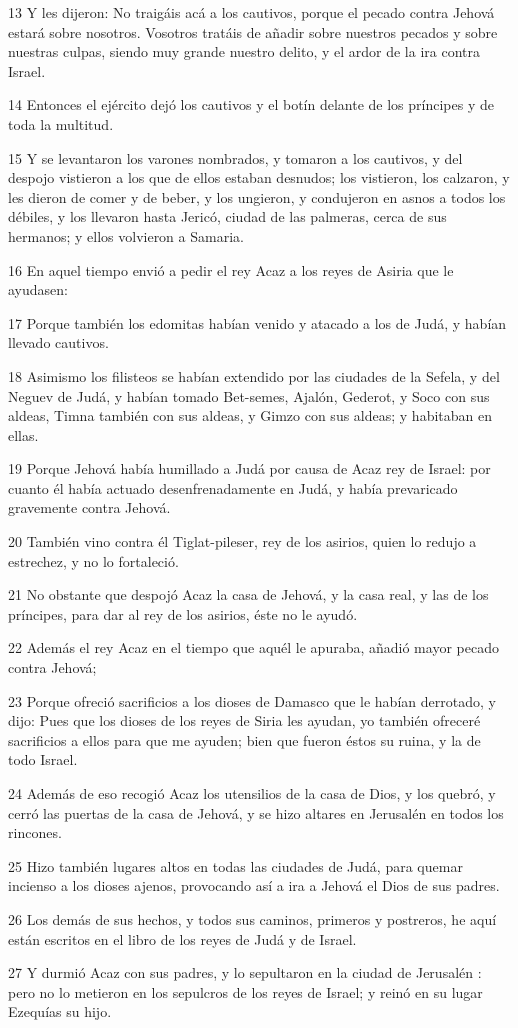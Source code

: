 \par 13 Y les dijeron: No traigáis acá a los cautivos, porque el pecado contra Jehová estará sobre nosotros. Vosotros tratáis de añadir sobre nuestros pecados y sobre nuestras culpas, siendo muy grande nuestro delito, y el ardor de la ira contra Israel.
\par 14 Entonces el ejército dejó los cautivos y el botín delante de los príncipes y de toda la multitud.
\par 15 Y se levantaron los varones nombrados, y tomaron a los cautivos, y del despojo vistieron a los que de ellos estaban desnudos; los vistieron, los calzaron, y les dieron de comer y de beber, y los ungieron, y condujeron en asnos a todos los débiles, y los llevaron hasta Jericó, ciudad de las palmeras, cerca de sus hermanos; y ellos volvieron a Samaria.
\par 16 En aquel tiempo envió a pedir el rey Acaz a los reyes de Asiria que le ayudasen:
\par 17 Porque también los edomitas habían venido y atacado a los de Judá, y habían llevado cautivos.
\par 18 Asimismo los filisteos se habían extendido por las ciudades de la Sefela, y del Neguev de Judá, y habían tomado Bet-semes, Ajalón, Gederot, y Soco con sus aldeas, Timna también con sus aldeas, y Gimzo con sus aldeas; y habitaban en ellas.
\par 19 Porque Jehová había humillado a Judá por causa de Acaz rey de Israel: por cuanto él había actuado desenfrenadamente en Judá, y había prevaricado gravemente contra Jehová.
\par 20 También vino contra él Tiglat-pileser, rey de los asirios, quien lo redujo a estrechez, y no lo fortaleció.
\par 21 No obstante que despojó Acaz la casa de Jehová, y la casa real, y las de los príncipes, para dar al rey de los asirios, éste no le ayudó.
\par 22 Además el rey Acaz en el tiempo que aquél le apuraba, añadió mayor pecado contra Jehová;
\par 23 Porque ofreció sacrificios a los dioses de Damasco que le habían derrotado, y dijo: Pues que los dioses de los reyes de Siria les ayudan, yo también ofreceré sacrificios a ellos para que me ayuden; bien que fueron éstos su ruina, y la de todo Israel. 
\par 24 Además de eso recogió Acaz  los utensilios de la casa de Dios, y los quebró, y cerró las puertas de la casa de Jehová,  y se hizo altares en Jerusalén  en todos los rincones.
\par 25 Hizo también lugares altos en todas las ciudades de Judá, para quemar incienso a los dioses ajenos, provocando así a ira a Jehová el Dios de sus padres.
\par 26 Los demás de sus hechos, y todos sus caminos, primeros y postreros, he aquí están escritos en el libro de los reyes de Judá y de Israel.
\par 27 Y durmió Acaz con sus padres, y lo sepultaron en la ciudad de Jerusalén : pero no lo metieron en los sepulcros de los reyes de Israel; y reinó en su lugar Ezequías su hijo.

